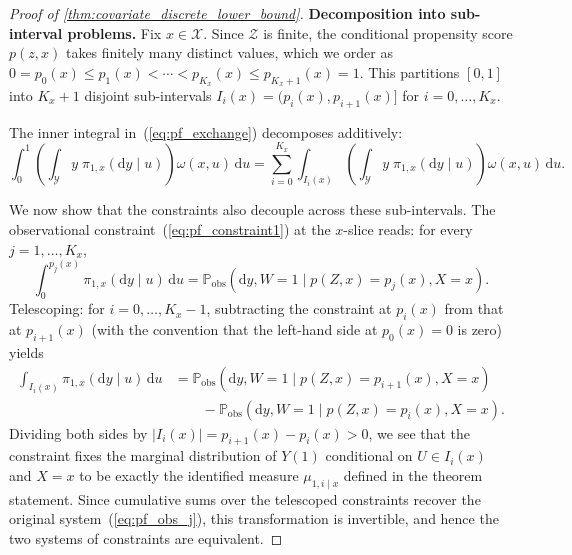 \begin{proof}[Proof of \cref{thm:covariate_discrete_lower_bound}]
\medskip
\noindent\textbf{Decomposition into sub-interval problems.}
Fix $x \in \mathcal{X}$. Since $\mathcal{Z}$ is finite, the conditional propensity score $p(z,x)$ takes finitely many distinct values, which we order as $0 = p_0(x) \leqslant p_1(x) < \cdots < p_{K_x}(x) \leqslant p_{K_x+1}(x) = 1$. This partitions $[0,1]$ into $K_x + 1$ disjoint sub-intervals $I_i(x) = (p_i(x), p_{i+1}(x)]$ for $i = 0, \ldots, K_x$.

The inner integral in~(\ref{eq:pf_exchange}) decomposes additively:
\begin{equation}\label{eq:pf_decompose}
    \int_0^1 \left(\int_{\mathcal{Y}} y\;\pi_{1,x}(\mathrm{d}y \mid u)\right)\omega(x,u)\,\mathrm{d}u = \sum_{i=0}^{K_x} \int_{I_i(x)} \left(\int_{\mathcal{Y}} y\;\pi_{1,x}(\mathrm{d}y \mid u)\right)\omega(x,u)\,\mathrm{d}u.
\end{equation}

We now show that the constraints also decouple across these sub-intervals. The observational constraint~(\ref{eq:pf_constraint1}) at the $x$-slice reads: for every $j = 1, \ldots, K_x$,
\begin{equation}\label{eq:pf_obs_j}
    \int_0^{p_j(x)} \pi_{1,x}(\mathrm{d}y \mid u)\,\mathrm{d}u = \mathbb{P}_{\text{obs}}(\mathrm{d}y, W\!=\!1 \mid p(Z,x) = p_j(x), X = x).
\end{equation}
Telescoping: for $i = 0, \ldots, K_x - 1$, subtracting the constraint at $p_i(x)$ from that at $p_{i+1}(x)$ (with the convention that the left-hand side at $p_0(x) = 0$ is zero) yields
\begin{equation}\label{eq:pf_telescope}
   \begin{split}
        \int_{I_i(x)} \pi_{1,x}(\mathrm{d}y \mid u)\,\mathrm{d}u &= \mathbb{P}_{\text{obs}}(\mathrm{d}y, W\!=\!1 \mid p(Z,x)\!=\!p_{i+1}(x), X\!=\!x) \\
        &\quad\quad - \mathbb{P}_{\text{obs}}(\mathrm{d}y, W\!=\!1 \mid p(Z,x)\!=\!p_i(x), X\!=\!x).
   \end{split}
\end{equation}
Dividing both sides by $|I_i(x)| = p_{i+1}(x) - p_i(x) > 0$, we see that the constraint fixes the marginal distribution of $Y(1)$ conditional on $U \in I_i(x)$ and $X = x$ to be exactly the identified measure $\mu_{1, i \mid x}$ defined in the theorem statement. Since cumulative sums over the telescoped constraints recover the original system~(\ref{eq:pf_obs_j}), this transformation is invertible, and hence the two systems of constraints are equivalent.


\end{proof}
